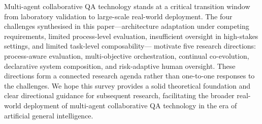 Multi-agent collaborative QA technology stands at a critical transition
window from laboratory validation to large-scale real-world deployment.
The four challenges synthesised in this paper---architecture adaptation under
competing requirements, limited process-level evaluation, insufficient
oversight in high-stakes settings, and limited task-level composability---
motivate five research directions: process-aware evaluation, multi-objective
orchestration, continual co-evolution, declarative system composition, and
risk-adaptive human oversight. These directions form a connected research
agenda rather than one-to-one responses to the challenges.
We hope this survey provides a solid theoretical foundation and clear
directional guidance for subsequent research, facilitating the broader
real-world deployment of multi-agent collaborative QA technology in the
era of artificial general intelligence.
